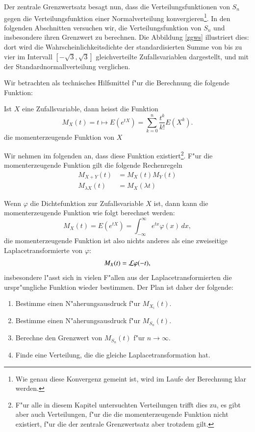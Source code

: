 Der zentrale Grenzwertsatz besagt nun, dass die Verteilungsfunktionen
von $S_n$ gegen die Verteilungsfunktion einer Normalverteilung
konvergieren\footnote{Wie genau diese Konvergenz gemeint ist, wird
im Laufe der Berechnung klar werden.}. In den folgenden Abschnitten
versuchen wir, die Verteilungsfunktion von $S_n$ und insbesondere
ihren Grenzwert zu berechnen. Die Abbildung \ref{zgws} illustriert
dies: dort wird die Wahrscheinlichkeitsdichte der standardisierten
Summe von bis zu vier im
Intervall $[-\sqrt{3},\sqrt{3}]$ gleichverteilte Zufallsvariablen dargestellt,
und mit der Standardnormallverteilung verglichen.

Wir betrachten als technisches Hilfsmittel f"ur die Berechnung
die folgende Funktion:
\begin{definition} Ist $X$ eine Zufallsvariable, dann heisst die Funktion
\[
M_X(t)=t\mapsto E(e^{tX})=\sum_{k=0}^n\frac{t^k}{k!}E(X^k).
\]
die momenterzeugende Funktion von $X$
\end{definition}
Wir nehmen im folgenden
an, dass diese Funktion existiert\footnote{F"ur alle in diesem Kapitel
untersuchten Verteilungen trifft dies zu, es gibt aber auch Verteilungen,
f"ur die die momenterzeugende Funktion nicht existiert, f"ur die der
zentrale Grenzwertsatz aber trotzdem gilt.}. F"ur die momenterzeugende
Funktion gilt die folgende Rechenregeln
\begin{align*}
M_{X+Y}(t)&=M_X(t)M_Y(t)\\
M_{\lambda X}(t)&=M_X(\lambda t)
\end{align*}

Wenn $\varphi$ die Dichtefunktion zur Zufallsvariable $X$ ist, dann
kann die momenterzeugende Funktion wie folgt berechnet werden:
\[
M_X(t)=E(e^{tX})=\int_{-\infty}^\infty e^{tx}\varphi(x)\,dx,
\]
die momenterzeugende Funktion ist also nichts anderes als eine
zweiseitige Laplacetransformierte von $\varphi$:
\[
M_X(t)={\cal L}\varphi(-t),
\]
insbesondere l"asst sich in vielen F"allen aus der Laplacetransformierten
die urspr"ungliche Funktion wieder bestimmen.
Der Plan ist daher der folgende:
\begin{enumerate}
\item Bestimme einen N"aherungsausdruck f"ur $M_{X_i}(t)$.
\item Bestimme einen N"aherungsausdruck f"ur $M_{S_n}(t)$.
\item Berechne den Grenzwert von $M_{S_n}(t)$ f"ur $n\to\infty$.
\item Finde eine Verteilung, die die gleiche Laplacetransformation
hat.
\end{enumerate}

